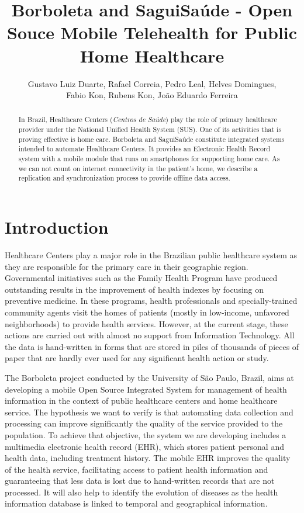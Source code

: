\documentclass[12pt]{article}
\title{Borboleta and SaguiSaúde - Open Souce Mobile Telehealth for Public Home Healthcare}
\author{Gustavo Luiz Duarte, Rafael Correia, Pedro Leal, Helves Domingues, \\
		Fabio Kon, Rubens Kon, João Eduardo Ferreira}
\begin{document}
\maketitle

\begin{abstract}
	
In Brazil, Healthcare Centers (\emph{Centros de Saúde}) play the role of primary healthcare provider under the National Unified Health System (SUS). One of its activities that is proving effective is home care. Borboleta and SaguiSaúde constitute integrated systems intended to automate Healthcare Centers. It provides an Electronic Health Record system with a mobile module that runs on smartphones for supporting home care. As we can not count on internet connectivity in the patient's home, we describe a replication and synchronization process to provide offline data access.
  
\end{abstract}

\section{Introduction}

Healthcare Centers play a major role in the Brazilian public healthcare system as they are responsible for the primary care in their geographic region. Governmental initiatives such as the Family Health Program have produced outstanding results in the improvement of health indexes by focusing on preventive medicine. In these programs, health professionals and specially-trained community agents visit the homes of patients (mostly in low-income, unfavored neighborhoods) to provide health services. However, at the current stage, these actions are carried out with almost no support from Information Technology. All the data is hand-written in forms that are stored in piles of thousands of pieces of paper that are hardly ever used for any significant health action or study.

The Borboleta project conducted by the University of São Paulo, Brazil, aims at developing a mobile Open Source Integrated System for management of health information in the context of public healthcare centers and home healthcare service. The hypothesis we want to verify is that automating data collection and processing can improve significantly the quality of the service provided to the population. To achieve that objective, the system we are developing includes a multimedia electronic health record (EHR), which stores patient personal and health data, including treatment history. The mobile EHR improves the quality of the health service, facilitating access to patient health information and guaranteeing that less data is lost due to hand-written records that are not processed. It will also help to identify the evolution of diseases as the health information database is linked to temporal and geographical information.
\end{document}
